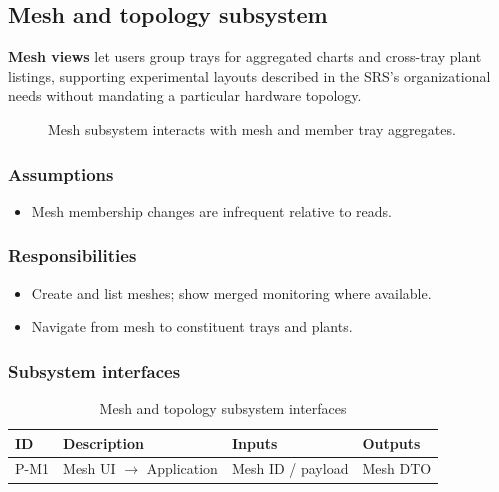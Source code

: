 \subsection{Mesh and topology subsystem}

\textbf{Mesh views} let users group trays for aggregated charts and cross-tray plant listings, supporting experimental layouts described in the SRS's organizational needs without mandating a particular hardware topology.

\begin{figure}[H]
\centering
{}
\caption{Mesh subsystem interacts with mesh and member tray aggregates.}
\label{fig:pres-mesh}
\end{figure}

\subsubsection{Assumptions}
\begin{itemize}
  \item Mesh membership changes are infrequent relative to reads.
\end{itemize}

\subsubsection{Responsibilities}
\begin{itemize}
  \item Create and list meshes; show merged monitoring where available.
  \item Navigate from mesh to constituent trays and plants.
\end{itemize}

\subsubsection{Subsystem interfaces}
\begin{table}[H]
\centering
\small
\begin{tabular}{|p{0.9cm}|p{3.4cm}|p{3.0cm}|p{3.5cm}|}
\hline
\textbf{ID} & \textbf{Description} & \textbf{Inputs} & \textbf{Outputs} \\
\hline
P-M1 & Mesh UI $\rightarrow$ Application & Mesh ID / payload & Mesh DTO \\
\hline
\end{tabular}
\caption{Mesh and topology subsystem interfaces}
\end{table}

